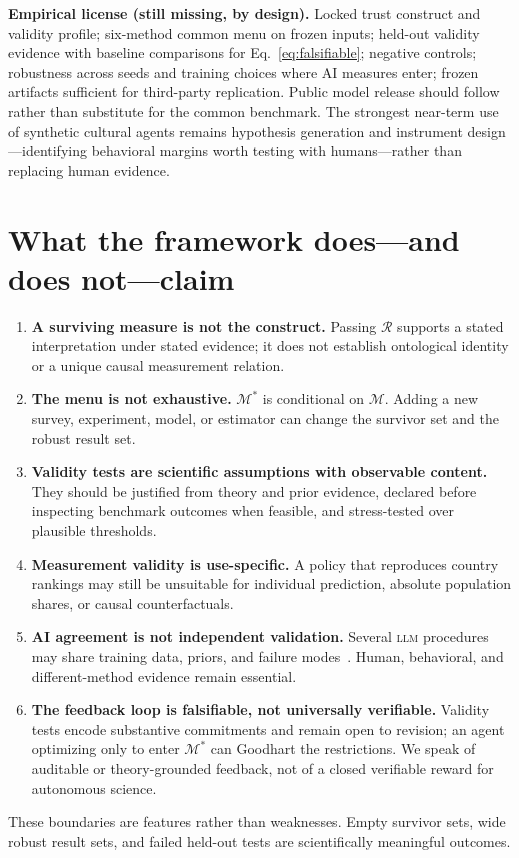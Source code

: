 \documentclass[10pt,letterpaper]{article}
\newcommand{\LLM}{\textsc{llm}}
\newcommand{\M}{\ensuremath{\mathcal{M}}}
\newcommand{\Rset}{\mathcal{R}}
\begin{document}
\textbf{Empirical license (still missing, by design).}
 Locked trust construct and validity profile; six-method common menu on frozen inputs; held-out validity evidence with baseline comparisons for Eq.~\eqref{eq:falsifiable}; negative controls; robustness across seeds and training choices where AI measures enter; frozen artifacts sufficient for third-party replication.
Public model release should follow rather than substitute for the common benchmark.
The strongest near-term use of synthetic cultural agents remains hypothesis generation and instrument design---identifying behavioral margins worth testing with humans---rather than replacing human evidence.

\section{What the framework does---and does not---claim}
\label{sec:boundaries}
\begin{enumerate}
\item \textbf{A surviving measure is not the construct.} Passing $\Rset$ supports a stated interpretation under stated evidence; it does not establish ontological identity or a unique causal measurement relation.
\item \textbf{The menu is not exhaustive.} $\M^*$ is conditional on $\M$. Adding a new survey, experiment, model, or estimator can change the survivor set and the robust result set.
\item \textbf{Validity tests are scientific assumptions with observable content.} They should be justified from theory and prior evidence, declared before inspecting benchmark outcomes when feasible, and stress-tested over plausible thresholds.
\item \textbf{Measurement validity is use-specific.} A policy that reproduces country rankings may still be unsuitable for individual prediction, absolute population shares, or causal counterfactuals.
\item \textbf{AI agreement is not independent validation.} Several \LLM{} procedures may share training data, priors, and failure modes~\cite{campbell1959}. Human, behavioral, and different-method evidence remain essential.
\item \textbf{The feedback loop is falsifiable, not universally verifiable.} Validity tests encode substantive commitments and remain open to revision; an agent optimizing only to enter $\M^*$ can Goodhart the restrictions. We speak of auditable or theory-grounded feedback, not of a closed verifiable reward for autonomous science.
\end{enumerate}
These boundaries are features rather than weaknesses.
Empty survivor sets, wide robust result sets, and failed held-out tests are scientifically meaningful outcomes.
\end{document}
